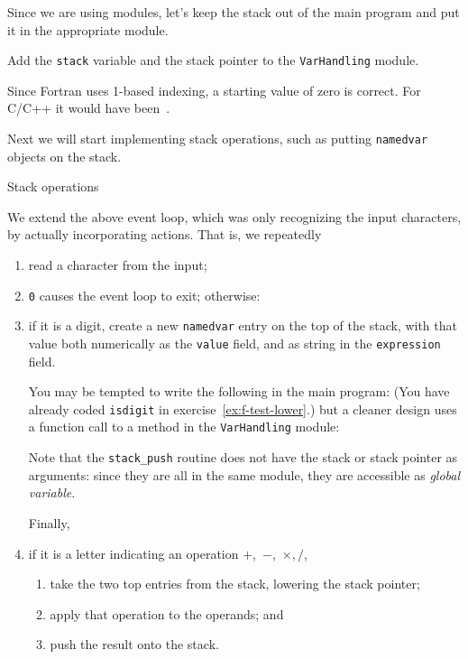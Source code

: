 Since we are using modules, let's keep the stack out of the main program
and put it in the appropriate module.

\begin{exercise}
  \label{ex:f-stack-in-mod}
  Add the \lstinline{stack} variable and the stack pointer
  to the \lstinline{VarHandling} module.
\end{exercise}

Since Fortran uses 1-based indexing,
a starting value of zero is correct.
For C/C++ it would have been~.

Next we will start implementing stack operations,
such as putting \lstinline{namedvar} objects on the stack.

 {Stack operations}

We extend the above event loop,
which was only recognizing the input characters,
by actually incorporating actions.
That is, we repeatedly
\begin{enumerate}
\item read a character from the input;
\item \lstinline{0} causes the event loop to exit; otherwise:
\item if it is a digit, create a new \lstinline{namedvar} entry
  on the top of the stack, with that value both numerically as the
  \lstinline{value} field, and as string in the \lstinline{expression} field.

  You may be tempted to write the following in the main program:
  (You have already coded \lstinline{isdigit} in exercise~\ref{ex:f-test-lower}.)
  but a cleaner design uses a function call
  to a method in the \lstinline{VarHandling} module:
  \begin{multicols}{2}
    \columnbreak
  \end{multicols}
  Note that the \lstinline{stack_push} routine does not have the stack
  or stack pointer as arguments: since they are all in the same module,
  they are accessible as
  \emph{global variable}.

  Finally,
\item if it is a letter indicating an operation $+$,~$-$,~$\times,/$,
  \begin{enumerate}
  \item take the two top entries from the stack, lowering the stack pointer;
  \item apply that operation to the operands; and
  \item push the result onto the stack.
  \end{enumerate}
\end{enumerate}

